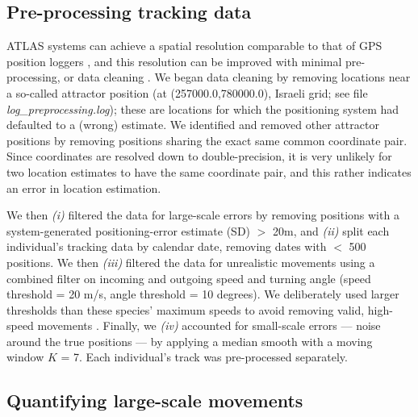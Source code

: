 \begin{refsection}
\subsection{Pre-processing tracking data}

ATLAS systems can achieve a spatial resolution comparable to that of GPS position loggers \citep{weiser2016,beardsworth2021}, and this resolution can be improved with minimal pre-processing, or data cleaning \citep{beardsworth2021, gupte2022d}.
We began data cleaning by removing locations near a so-called attractor position (at (257000.0,780000.0), Israeli grid; see file \textit{log\_preprocessing.log}); these are locations for which the positioning system had defaulted to a (wrong) estimate.
We identified and removed other attractor positions by removing positions sharing the exact same common coordinate pair. 
Since coordinates are resolved down to double-precision, it is very unlikely for two location estimates to have the same coordinate pair, and this rather indicates an error in location estimation.

We then \textit{(i)} filtered the data for large-scale errors by removing positions with a system-generated positioning-error estimate (SD) $>$ 20m, and \textit{(ii)} split each individual's tracking data by calendar date, removing dates with $<$ 500 positions. We then \textit{(iii)} filtered the data for unrealistic movements using a combined filter on incoming and outgoing speed and turning angle (speed threshold = 20 m/s, angle threshold = 10 degrees).
We deliberately used larger thresholds than these species' maximum speeds to avoid removing valid, high-speed movements \citep{gupte2022d}.
Finally, we \textit{(iv)} accounted for small-scale errors --- noise around the true positions --- by applying a median smooth with a moving window $K$ = 7.
Each individual's track was pre-processed separately.

\subsection{Quantifying large-scale movements}


\end{refsection}
